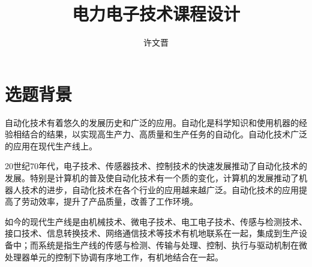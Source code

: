\documentclass[12pt]{article}
\title{电力电子技术课程设计}
\author{许文晋}
\begin{document}
\tableofcontents
\pagebreak
{}

\section{选题背景}
自动化技术有着悠久的发展历史和广泛的应用。自动化是科学知识和使用机器的经验相结合的结果，以实现高生产力、高质量和生产任务的自动化。自动化技术广泛的应用在现代生产线上。

20世纪70年代，电子技术、传感器技术、控制技术的快速发展推动了自动化技术的发展。特别是计算机的普及使自动化技术有一个质的变化，计算机的发展推动了机器人技术的进步，自动化技术在各个行业的应用越来越广泛。自动化技术的应用提高了劳动效率，提升了产品质量，改善了工作环境。

如今的现代生产线是由机械技术、微电子技术、电工电子技术、传感与检测技术、接口技术、信息转换技术、网络通信技术等技术有机地联系在一起，集成到生产设备中；而系统是指生产线的传感与检测、传输与处理、控制、执行与驱动机制在微处理器单元的控制下协调有序地工作，有机地结合在一起。
\end{document}
